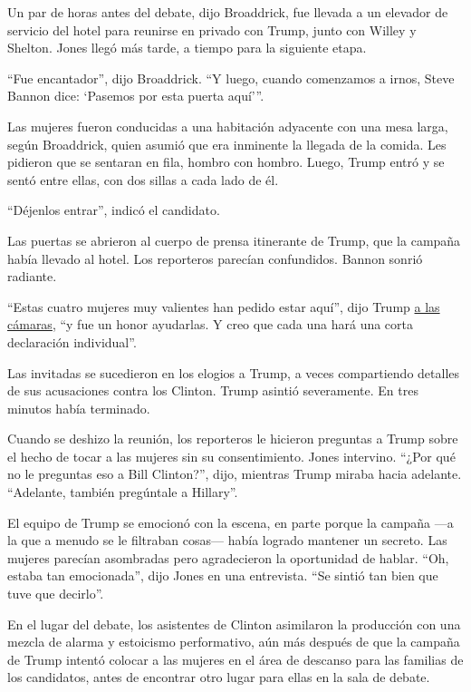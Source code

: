 Un par de horas antes del debate, dijo Broaddrick, fue llevada a un
elevador de servicio del hotel para reunirse en privado con Trump, junto
con Willey y Shelton. Jones llegó más tarde, a tiempo para la siguiente
etapa.

``Fue encantador'', dijo Broaddrick. ``Y luego, cuando comenzamos a
irnos, Steve Bannon dice: `Pasemos por esta puerta aquí'''.

Las mujeres fueron conducidas a una habitación adyacente con una mesa
larga, según Broaddrick, quien asumió que era inminente la llegada de la
comida. Les pidieron que se sentaran en fila, hombro con hombro. Luego,
Trump entró y se sentó entre ellas, con dos sillas a cada lado de él.

``Déjenlos entrar'', indicó el candidato.

Las puertas se abrieron al cuerpo de prensa itinerante de Trump, que la
campaña había llevado al hotel. Los reporteros parecían confundidos.
Bannon sonrió radiante.

``Estas cuatro mujeres muy valientes han pedido estar aquí'', dijo Trump
\href{https://www.facebook.com/DonaldTrump/videos/10157857037430725/}{a
las cámaras}, ``y fue un honor ayudarlas. Y creo que cada una hará una
corta declaración individual''.

Las invitadas se sucedieron en los elogios a Trump, a veces compartiendo
detalles de sus acusaciones contra los Clinton. Trump asintió
severamente. En tres minutos había terminado.

Cuando se deshizo la reunión, los reporteros le hicieron preguntas a
Trump sobre el hecho de tocar a las mujeres sin su consentimiento. Jones
intervino. ``¿Por qué no le preguntas eso a Bill Clinton?'', dijo,
mientras Trump miraba hacia adelante. ``Adelante, también pregúntale a
Hillary''.

El equipo de Trump se emocionó con la escena, en parte porque la campaña
---a la que a menudo se le filtraban cosas--- había logrado mantener un
secreto. Las mujeres parecían asombradas pero agradecieron la
oportunidad de hablar. ``Oh, estaba tan emocionada'', dijo Jones en una
entrevista. ``Se sintió tan bien que tuve que decirlo''.

En el lugar del debate, los asistentes de Clinton asimilaron la
producción con una mezcla de alarma y estoicismo performativo, aún más
después de que la campaña de Trump intentó colocar a las mujeres en el
área de descanso para las familias de los candidatos, antes de encontrar
otro lugar para ellas en la sala de debate.

